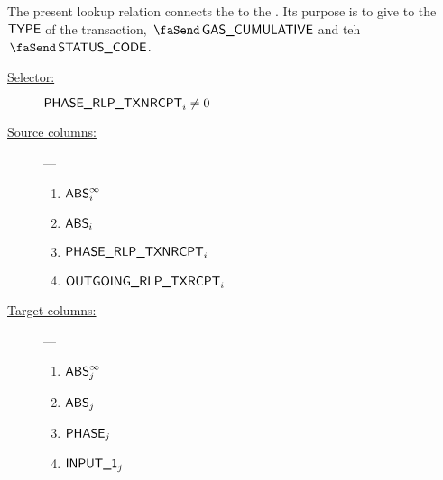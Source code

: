 The present lookup relation connects the \txnDataMod{} to the \rlpTxnRcptMod{}. Its purpose is to give to \rlpTxnRcptMod{} the $\textsf{TYPE}$ of the transaction, $\txCumulativeConsumedGas$ and teh $\txStatusCode$. 
\begin{description}
	\item[\underline{Selector:}] $\textsf{PHASE\_RLP\_TXNRCPT}_{i} \ne 0$
	\item[\underline{Source columns:}] ---
		\begin{multicols}{2}
			\begin{enumerate}
				\item $\textsf{ABS}^\infty_{i}$
				\item $\textsf{ABS}_{i}$
				\item $\textsf{PHASE\_RLP\_TXNRCPT}_{i}$
				\item $\textsf{OUTGOING\_RLP\_TXRCPT}_{i}$
			\end{enumerate}
		\end{multicols}
	\item[\underline{Target columns:}] ---
		\begin{multicols}{2}
			\begin{enumerate}
				\item $\textsf{ABS}^\infty_{j}$
				\item $\textsf{ABS}_{j}$
				\item $\textsf{PHASE}_{j}$
				\item $\textsf{INPUT\_1}_{j}$
			\end{enumerate}
		\end{multicols}
\end{description}
